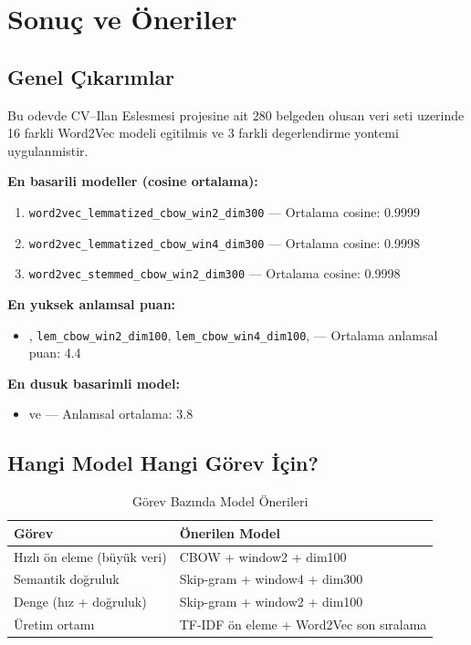 \documentclass[12pt, a4paper]{article}
\begin{document}
\section{Sonuç ve Öneriler}

\subsection{Genel Çıkarımlar}

Bu odevde CV--Ilan Eslesmesi projesine ait 280 belgeden olusan veri seti uzerinde 16 farkli Word2Vec modeli egitilmis ve 3 farkli degerlendirme yontemi uygulanmistir.

\textbf{En basarili modeller (cosine ortalama):}
\begin{enumerate}
    \item \texttt{word2vec\_lemmatized\_cbow\_win2\_dim300} --- Ortalama cosine: 0.9999
    \item \texttt{word2vec\_lemmatized\_cbow\_win4\_dim300} --- Ortalama cosine: 0.9998
    \item \texttt{word2vec\_stemmed\_cbow\_win2\_dim300} --- Ortalama cosine: 0.9998
\end{enumerate}

\textbf{En yuksek anlamsal puan:}
\begin{itemize}
    \item \texttt{}, \texttt{lem\_cbow\_win2\_dim100}, \texttt{lem\_cbow\_win4\_dim100}, \texttt{} --- Ortalama anlamsal puan: 4.4
\end{itemize}

\textbf{En dusuk basarimli model:}
\begin{itemize}
    \item \texttt{} ve \texttt{} --- Anlamsal ortalama: 3.8
\end{itemize}

\subsection{Hangi Model Hangi Görev İçin?}

\begin{table}[H]
\centering
\caption{Görev Bazında Model Önerileri}
\begin{tabular}{ll}
\toprule
\textbf{Görev} & \textbf{Önerilen Model} \\
\midrule
Hızlı ön eleme (büyük veri) & CBOW + window2 + dim100 \\
Semantik doğruluk & Skip-gram + window4 + dim300 \\
Denge (hız + doğruluk) & Skip-gram + window2 + dim100 \\
Üretim ortamı & TF-IDF ön eleme + Word2Vec son sıralama \\
\bottomrule
\end{tabular}
\end{table}
\end{document}
